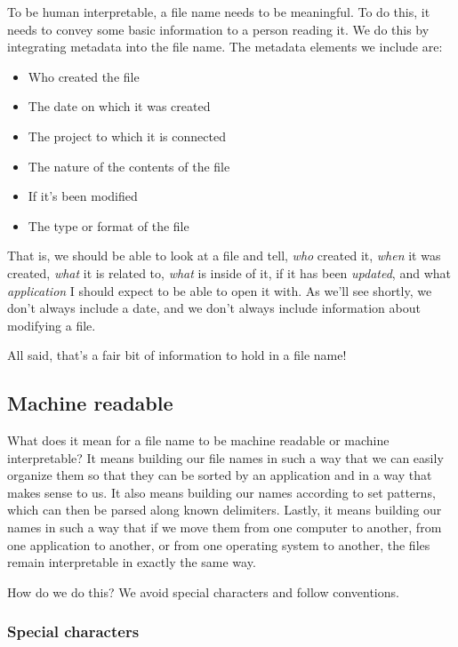 \documentclass[
]{book}
\providecommand{\tightlist}{%
  \setlength{\itemsep}{0pt}\setlength{\parskip}{0pt}}
\begin{document}
To be human interpretable, a file name needs to be meaningful. To do this, it needs to convey some basic information to a person reading it. We do this by integrating metadata into the file name. The metadata elements we include are:

\begin{itemize}
\tightlist
\item
  Who created the file
\item
  The date on which it was created
\item
  The project to which it is connected
\item
  The nature of the contents of the file
\item
  If it's been modified
\item
  The type or format of the file
\end{itemize}

That is, we should be able to look at a file and tell, \emph{who} created it, \emph{when} it was created, \emph{what} it is related to, \emph{what} is inside of it, if it has been \emph{updated}, and what \emph{application} I should expect to be able to open it with. As we'll see shortly, we don't always include a date, and we don't always include information about modifying a file.

All said, that's a fair bit of information to hold in a file name!

\subsection*{Machine readable}\label{machine-readable}

What does it mean for a file name to be machine readable or machine interpretable? It means building our file names in such a way that we can easily organize them so that they can be sorted by an application and in a way that makes sense to us. It also means building our names according to set patterns, which can then be parsed along known delimiters. Lastly, it means building our names in such a way that if we move them from one computer to another, from one application to another, or from one operating system to another, the files remain interpretable in exactly the same way.

How do we do this? We avoid special characters and follow conventions.

\subsubsection*{Special characters}\label{special-characters}
\end{document}
